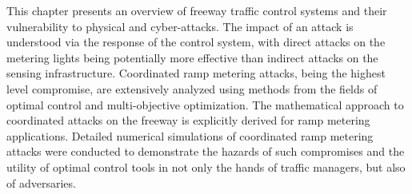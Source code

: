 This chapter presents an overview of freeway traffic control systems and their vulnerability to physical and cyber-attacks. The impact of an attack is understood via the response of the control system, with direct attacks on the metering lights being potentially more effective than indirect attacks on the sensing infrastructure. Coordinated ramp metering attacks, being the highest level compromise,  are extensively analyzed using methods from the fields of optimal control and multi-objective optimization. The mathematical approach to coordinated attacks on the freeway is explicitly derived for ramp metering applications. Detailed numerical simulations of coordinated ramp metering attacks were conducted to demonstrate the hazards of such compromises and the utility of optimal control tools in not only the hands of traffic managers, but also of adversaries.